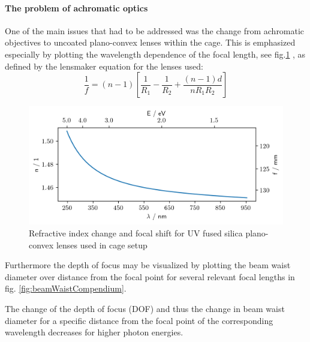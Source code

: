 \documentclass[twoside,openright]{scrreprt}
\begin{document}
\paragraph{The problem of achromatic optics}
One of the main issues that had to be addressed was the change from achromatic objectives to uncoated plano-convex lenses within the cage.\newline
This is emphasized especially by plotting the wavelength dependence of the focal length, see fig.\ref{fig:ChromFocalShift} , as defined by the lensmaker equation for the lenses used:
\begin{equation}
\frac{1}{f} = (n-1) \left[\frac{1}{R_1} - \frac{1}{R_2} + \frac{(n-1)d}{n R_1 R_2}\right]
\end{equation}
\begin{figure}[h]
\centering
\includegraphics[scale = 0.5]{images/ChromaticFocalShiftandDispersionUVFS.png} 
\caption{Refractive index change and focal shift for UV fused silica plano-convex lenses used in cage setup\cite{Malitson:65}\label{fig:ChromFocalShift}}
\end{figure}

Furthermore the depth of focus may be visualized by plotting the beam waist diameter over distance from the focal point for several relevant focal lengths in fig. \ref{fig:beamWaistCompendium}.

The change of the depth of focus (DOF) and thus the change in beam waist diameter for a specific distance from the focal point of the corresponding wavelength decreases for higher photon energies.
\end{document}
